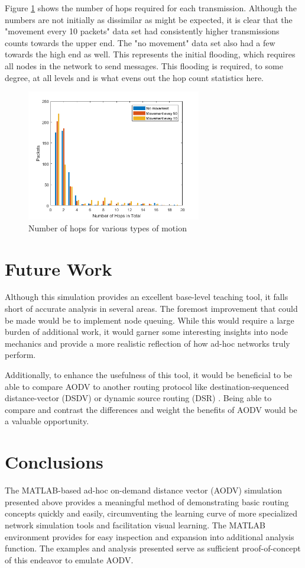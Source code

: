 \documentclass[conference]{IEEEtran}
\begin{document}
Figure \ref{fig:hops} shows the number of hops required for each transmission. Although the numbers are not initially as dissimilar as might be expected, it is clear that the "movement every 10 packets" data set had consistently higher transmissions counts towards the upper end. The "no movement" data set also had a few towards the high end as well. This represents the initial flooding, which requires all nodes in the network to send messages. This flooding is required, to some degree, at all levels and is what evens out the hop count statistics here.

\begin{figure}[ht]
	\centering
	\includegraphics[width=3in]{hops_overall.png}
	\caption{Number of hops for various types of motion}
	\label{fig:hops}
\end{figure}

\section{Future Work}

Although this simulation provides an excellent base-level teaching tool, it falls short of accurate analysis in several areas. The foremost improvement that could be made would be to implement node queuing. While this would require a large burden of additional work, it would garner some interesting insights into node mechanics and provide a more realistic reflection of how ad-hoc networks truly perform. 

Additionally, to enhance the usefulness of this tool, it would be beneficial to be able to compare AODV to another routing protocol like destination-sequenced distance-vector (DSDV)  \cite{perkins1994highly} or dynamic source routing (DSR) \cite{rfc4728}. Being able to compare and contrast the differences and weight the benefits of AODV would be a valuable opportunity.

\section{Conclusions}

The MATLAB-based ad-hoc on-demand distance vector (AODV) simulation presented above provides a meaningful method of demonstrating basic routing concepts quickly and easily, circumventing the learning curve of more specialized network simulation tools and facilitation visual learning. The MATLAB environment provides for easy inspection and expansion into additional analysis function. The examples and analysis presented serve as sufficient proof-of-concept of this endeavor to emulate AODV.



\end{document}
